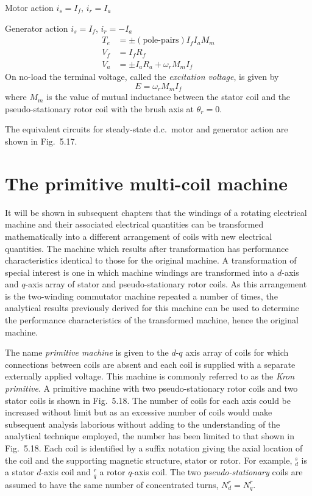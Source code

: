 \documentclass[a4paper,numbers=noenddot,12pt]{scrbook}
\begin{document}
        Motor action $i_s = I_f$, $i_r = I_a$

        Generator action $i_s = I_f$, $i_r = - I_a$
        \begin{align*}
            T_e & = \pm (\text{pole-pairs}) I_f I_a M_m \\
            V_f & = I_f R_f \\
            V_a & = \pm I_a R_a + \omega_r M_m I_f
        \end{align*}
        On no-load the terminal voltage, called the \emph{excitation voltage}, is given by
        \begin{equation*}
            E = \omega_r M_m I_f
        \end{equation*}
        where $M_m$ is the value of mutual inductance between the stator coil and the pseudo-stationary rotor coil with the brush axis at $\theta_r = 0$.

        The equivalent circuits for steady-state d.c.\ motor and generator action are shown in Fig.\ 5.17.

        \section{The primitive multi-coil machine}
        It will be shown in subsequent chapters that the windings of a rotating electrical machine and their associated electrical quantities can be transformed mathematically into a different arrangement of coils with new electrical quantities. The machine which results after transformation has performance characteristics identical to those for the original machine. A transformation of special interest is one in which machine windings are transformed into a $d$-axis and $q$-axis array of stator and pseudo-stationary rotor coils. As this arrangement is the two-winding commutator machine repeated a number of times, the analytical results previously derived for this machine can be used to determine the performance characteristics of the transformed machine, hence the original machine.

        The name \emph{primitive machine} is given to the $d$-$q$ axis array of coils for which connections between coils are absent and each coil is supplied with a separate externally applied voltage. This machine is commonly referred to as the \emph{Kron primitive}. A primitive machine with two pseudo-stationary rotor coils and two stator coils is shown in Fig.\ 5.18. The number of coils for each axis could be increased without limit but as an excessive number of coils would make subsequent analysis laborious without adding to the understanding of the analytical technique employed, the number has been limited to that shown in Fig.\ 5.18. Each coil is identified by a suffix notation giving the axial location of the coil and the supporting magnetic structure, stator or rotor. For example, $_d^s$ is a stator $d$-axis coil and $_q^r$ a rotor $q$-axis coil. The two \emph{pseudo-stationary} coils are assumed to have the same number of concentrated turns, $N_d^r = N_q^r$.
\end{document}
